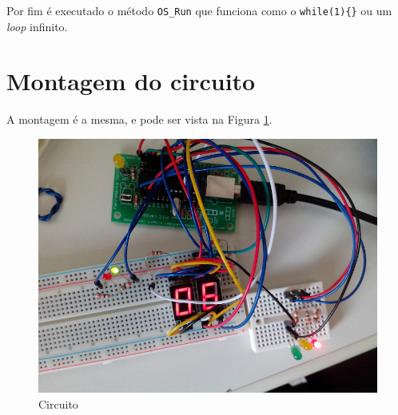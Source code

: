 Por fim é executado o método \texttt{OS\_Run} que funciona como o
\texttt{while(1)\{\}} ou um \emph{loop} infinito.

\section{Montagem do circuito}\label{montagem-do-circuito}

A montagem é a mesma, e pode ser vista na Figura \ref{fig:montagem}.

\begin{figure}[h]
    \includegraphics[scale=0.5]{img/IMG_20161208_100054.jpg}
    \caption{Circuito}\label{fig:montagem}
\end{figure}
